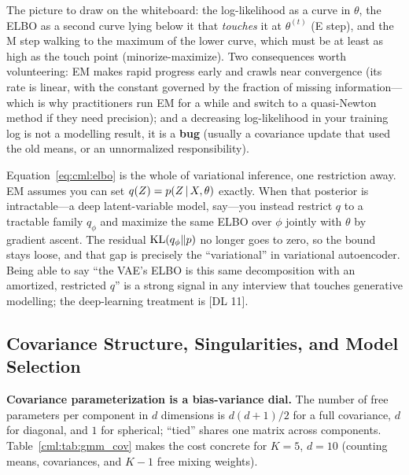 The picture to draw on the whiteboard: the log-likelihood as a curve in $\theta$, the ELBO as a second curve lying below it that \emph{touches} it at $\theta^{(t)}$ (E step), and the M step walking to the maximum of the lower curve, which must be at least as high as the touch point (minorize-maximize). Two consequences worth volunteering: EM makes rapid progress early and crawls near convergence (its rate is linear, with the constant governed by the fraction of missing information---which is why practitioners run EM for a while and switch to a quasi-Newton method if they need precision); and a decreasing log-likelihood in your training log is not a modelling result, it is a \textbf{bug} (usually a covariance update that used the old means, or an unnormalized responsibility).

\begin{keyinsight}
Equation~\eqref{eq:cml:elbo} is the whole of variational inference, one restriction away. EM assumes you can set $q(Z) = p(Z \,|\, X, \theta)$ exactly. When that posterior is intractable---a deep latent-variable model, say---you instead restrict $q$ to a tractable family $q_\phi$ and maximize the same ELBO over $\phi$ jointly with $\theta$ by gradient ascent. The residual $\operatorname{KL}(q_\phi \| p)$ no longer goes to zero, so the bound stays loose, and that gap is precisely the ``variational'' in variational autoencoder. Being able to say ``the VAE's ELBO is this same decomposition with an amortized, restricted $q$'' is a strong signal in any interview that touches generative modelling; the deep-learning treatment is [DL 11].
\end{keyinsight}

\subsection{Covariance Structure, Singularities, and Model Selection}

\textbf{Covariance parameterization is a bias-variance dial.} The number of free parameters per component in $d$ dimensions is $d(d+1)/2$ for a full covariance, $d$ for diagonal, and $1$ for spherical; ``tied'' shares one matrix across components. Table~\ref{cml:tab:gmm_cov} makes the cost concrete for $K=5$, $d=10$ (counting means, covariances, and $K-1$ free mixing weights).


